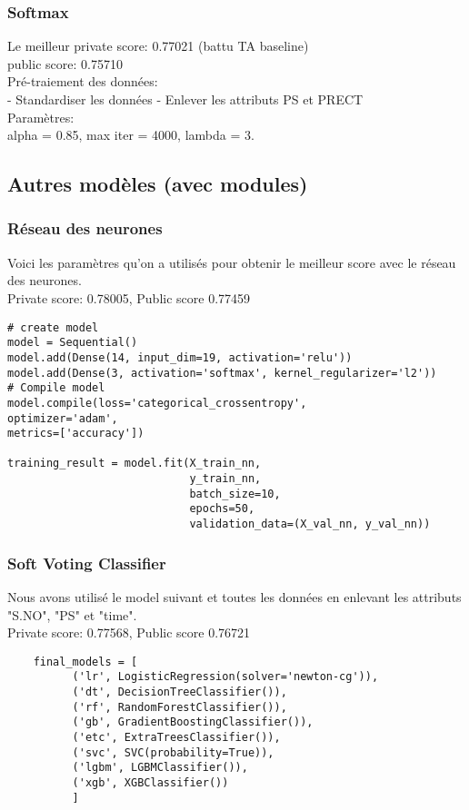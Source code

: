 \documentclass{article}
\begin{document}
\subsubsection{Softmax}
\noindent
Le meilleur private score: 0.77021 (battu TA baseline) \\
public score: 0.75710 \\
Pré-traiement des données: \\
- Standardiser les données
- Enlever les attributs PS et PRECT \\
Paramètres: \\
alpha = 0.85, max iter = 4000, lambda = 3.  \\

\subsection{Autres modèles (avec modules)}
\subsubsection{Réseau des neurones}
Voici les paramètres qu'on a utilisés pour obtenir le meilleur score avec le 
réseau des neurones. \\
Private score: 0.78005, 
Public score 0.77459 \\
\begin{verbatim}
# create model
model = Sequential()
model.add(Dense(14, input_dim=19, activation='relu'))
model.add(Dense(3, activation='softmax', kernel_regularizer='l2'))
# Compile model
model.compile(loss='categorical_crossentropy',
optimizer='adam', 
metrics=['accuracy'])

training_result = model.fit(X_train_nn, 
                            y_train_nn, 
                            batch_size=10, 
                            epochs=50, 
                            validation_data=(X_val_nn, y_val_nn))
\end{verbatim}

\subsubsection{Soft Voting Classifier}
Nous avons utilisé le model suivant et toutes les données en enlevant les attributs "S.NO", "PS" et "time". \\
Private score: 0.77568, 
Public score 0.76721 
\begin{verbatim}
    final_models = [
          ('lr', LogisticRegression(solver='newton-cg')),           
          ('dt', DecisionTreeClassifier()),           
          ('rf', RandomForestClassifier()),           
          ('gb', GradientBoostingClassifier()),            
          ('etc', ExtraTreesClassifier()),           
          ('svc', SVC(probability=True)),           
          ('lgbm', LGBMClassifier()),           
          ('xgb', XGBClassifier())
          ]
\end{verbatim}
\end{document}
